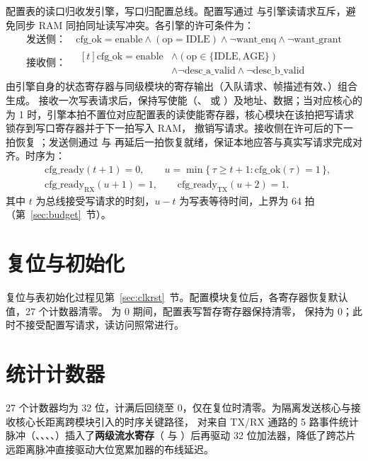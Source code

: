 配置表的读口归收发引擎，写口归配置总线。配置写通过  与引擎读请求互斥，避免同步 RAM 同拍同址读写冲突。各引擎的许可条件为：
\begin{align}
\text{发送侧：}\ & \text{cfg\_ok} = \text{enable} \wedge (\text{op}=\text{IDLE}) \wedge \neg\text{want\_enq} \wedge \neg\text{want\_grant} \\
\text{接收侧：}\ & \begin{aligned}[t]
  \text{cfg\_ok} = \text{enable} &\wedge (\text{op}\in\{\text{IDLE},\text{AGE}\}) \\
  &\wedge \neg\text{desc\_a\_valid} \wedge \neg\text{desc\_b\_valid}
\end{aligned}
\end{align}
 由引擎自身的状态寄存器与同级模块的寄存输出（入队请求、帧描述有效、）组合生成。 接收一次写表请求后，保持写使能（、 或 ）及地址、数据；当对应核心的  为 1 时，引擎本拍不置位对应配置表的读使能寄存器，核心模块在该拍把写请求锁存到写口寄存器并于下一拍写入 RAM， 撤销写请求。接收侧在许可后的下一拍恢复 ；发送侧通过  与  再延后一拍恢复就绪，保证本地应答与真实写请求完成对齐。时序为：
\begin{equation}
\begin{aligned}
&\text{cfg\_ready}(t+1)=0,\qquad
u=\min\{\,\tau \ge t+1 : \text{cfg\_ok}(\tau)=1\,\},\\
&\text{cfg\_ready}_{\mathrm{RX}}(u+1)=1,\qquad
\text{cfg\_ready}_{\mathrm{TX}}(u+2)=1.
\end{aligned}
\end{equation}
其中 $t$ 为总线接受写请求的时刻，$u-t$ 为写表等待时间，上界为 64 拍（第~\ref{sec:budget}~节）。


\section{复位与初始化}

复位与表初始化过程见第~\ref{sec:clkrst}~节。配置模块复位后，各寄存器恢复默认值，27 个计数器清零。 为 0 期间，配置表写暂存寄存器保持清零， 保持为 0；此时不接受配置写请求，读访问照常进行。

\section{统计计数器}

27 个计数器均为 32 位，计满后回绕至 0，仅在复位时清零。为隔离发送核心与接收核心长距离跨模块引入的时序关键路径， 对来自 TX/RX 通路的 5 路事件统计脉冲（、、、、）插入了\textbf{两级流水寄存}（ 与 ）后再驱动 32 位加法器，降低了跨芯片远距离脉冲直接驱动大位宽累加器的布线延迟。

